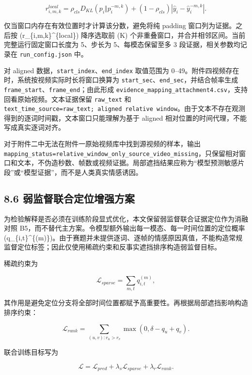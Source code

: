 \documentclass[
  12pt,
  a4paper,
]{ctexart}
\begin{document}
\[
r_{i,m,k}^{local}=
\rho_{cls}D_{KL}(p_i\Vert p_i^{-m,k})
 +(1-\rho_{cls})
 |\widehat y_i-\widehat y_i^{-m,k}|.
\]

仅当窗口内存在有效位置时才计算该分数，避免将纯 padding
窗口列为证据。之后按 (r\_\{i,m,k\}\^{}\{local\}) 降序选取前 (K)
个非重叠窗口，并合并相邻区间。当前完整运行固定窗口长度为 5、步长为
5、每模态保留至多 3 段证据，相关参数均记录在 \texttt{run\_config.json}
中。

对 aligned 数据，\texttt{start\_index}、\texttt{end\_index} 取值范围为
0--49。附件四视频存在时，系统按视频实际时长将窗口换算为
\texttt{start\_sec}、\texttt{end\_sec}，并结合帧率生成
\texttt{frame\_start}、\texttt{frame\_end}；由此形成
\texttt{evidence\_mapping\_attachment4.csv}，支持回看原始视频。文本证据保留
\texttt{raw\_text} 和
\texttt{text\_time\_source=raw\_text;\ aligned\ relative\ window}。由于文本不存在观测得到的逐词时间戳，文本窗口只能理解为基于
aligned 相对位置的时间代理，不能写成真实逐词对齐。

对于附件二中无法在附件一原始视频库中找到源视频的样本，输出
\texttt{mapping\_status=relative\_window\_only\_source\_video\_missing}，只保留相对窗口和文本，不伪造秒数、帧数或视频证据。局部遮挡结果应称为``模型预测敏感片段''或``模型证据''，而不是人类真实情感诱因。

\hypertarget{ux5f31ux76d1ux7763ux8054ux5408ux5b9aux4f4dux589eux5f3aux65b9ux6848}{%
\subsection{8.6
弱监督联合定位增强方案}\label{ux5f31ux76d1ux7763ux8054ux5408ux5b9aux4f4dux589eux5f3aux65b9ux6848}}

为检验解释是否必须在训练阶段显式优化，本文保留弱监督联合证据定位作为消融对照
B5，而不替代主方案。令模型额外输出每一模态、每一时间位置的定位概率
(q\_\{i,t\}\^{}\{(m)\})。由于赛题并未提供逐词、逐帧的情感原因真值，不能构造常规监督定位标签；因此仅使用稀疏约束和反事实遮挡排序构造弱监督目标。

稀疏约束为

\[
\mathcal L_{sparse}=\sum_{m,t}q_{i,t}^{(m)},
\]

其作用是避免定位分支将全部时间位置都赋予高重要性。再根据局部遮挡影响构造排序约束：

\[
\mathcal L_{rank}=\sum_{(u,v):r_u>r_v}
\max(0,\delta-q_u+q_v).
\]

联合训练目标写为

\[
\mathcal L=\mathcal L_{pred}
 +\lambda_s\mathcal L_{sparse}
 +\lambda_r\mathcal L_{rank}.
\]
\end{document}
